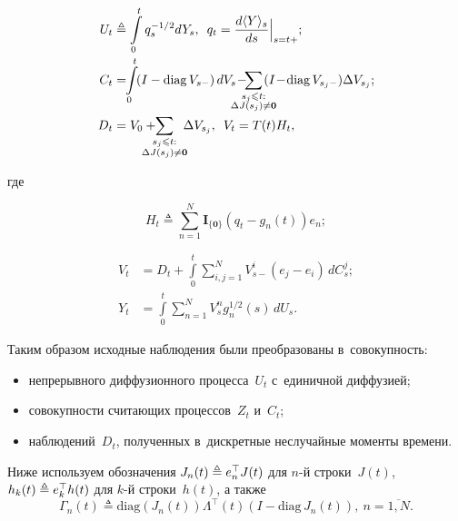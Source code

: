\begin{multicols}{2}
 \noindent
 \begin{align*}
  U_t &\triangleq
 \int\limits_0^t q_s^{-{1}/{2}}dY_s, \enskip
q_t = \fr{d  \langle   Y   \rangle_s}{ds}\Bigl|_{s=t+}; \\[-1pt]
  C_t &=   \displaystyle\!\!\int\limits_0^t \! (I-\mathrm{diag}\, V_{s-})\,dV_s\! -\! \!\!\!\!\!\!\!\!
  \sum\limits_{\substack{{s_j \leqslant t:}\\[-1pt]
  {\Delta J(s_j) \neq \mathbf{0}}}} \!\!\!\!\!\!
  (I\!-\!\mathrm{diag}\, V_{s_j-})\Delta V_{s_j};\\[-1pt]
  D_t &= V_0 + \!\!\!\!\!\!\!\!\sum\limits_{\substack{{s_j \leqslant t:}\\
  {\Delta J(s_j) \neq \mathbf{0}}}}\!\!\! \Delta V_{s_j},  \enskip
  V_t = T(t)H_t, 
  \end{align*}
  
  \vspace*{-3pt}
  
  \noindent
  где
  
\vspace*{-3pt}

\noindent
  $$
  H_t \triangleq \sum\limits_{n=1}^N\mathbf{I}_{\{\mathbf{0}\}}(q_t-g_n(t))e_n;
  $$

  
\noindent
\begin{align*}
 V_t &= D_t + \int\limits_0^t \sum\limits_{i,j=1}^N V_{s-}^i\left(e_j-e_i\right)\,dC_s^j; 
\\[-1pt]
 Y_t& = \int\limits_0^t \sum\limits_{n=1}^{N}V_{s}^n g_n^{{1}/{2}}(s)\,dU_s.
\end{align*}

\vspace*{-2pt}

\noindent
 Таким образом исходные наблюдения были преобразованы  в~совокупность:
 \begin{itemize}
 \item непрерывного диффузионного процесса~$U_t$ с~единичной диффузией;
 \item совокупности считающих процессов~$Z_t$ и~$C_t$;
 \item наблюдений~$D_t$, полученных в~дискретные неслучайные моменты времени.
 \end{itemize}

 Ниже используем обозначения
 $J_n(t) \hm\triangleq e_n^{\top} J(t)$  для $n$-й строки~$J(t)$, $h_k(t) 
 \hm\triangleq e_k^{\top} h(t)$ для $k$-й строки~$h(t)$, а также
 \begin{equation*}
\Gamma_n(t) \triangleq \mathrm{diag}\left(J_n(t)\right) \Lambda^{\top}(t)
\left(I-\mathrm{diag}\, J_n(t)\right), \  n=\overline{1,N}.
\end{equation*}


\end{multicols}
